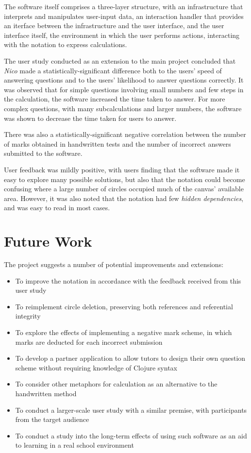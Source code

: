 \documentclass[12pt,twoside,notitlepage,xetex]{report}
\begin{document}
{The software itself comprises a three-layer structure, with an infrastructure that interprets and manipulates user-input data, an interaction handler that provides an iterface between the infrastructure and the user interface, and the user interface itself, the environment in which the user performs actions, interacting with the notation to express calculations.

The user study conducted as an extension to the main project concluded that \emph{Nico} made a statistically-significant difference both to the users' speed of answering questions and to the users' likelihood to answer questions correctly.  It was observed that for simple questions involving small numbers and few steps in the calculation, the software increased the time taken to answer.  For more complex questions, with many subcalculations and larger numbers, the software was shown to decrease the time taken for users to answer.

There was also a statistically-significant negative correlation between the number of marks obtained in handwritten tests and the number of incorrect answers submitted to the software.

User feedback was mildly positive, with users finding that the software made it easy to explore many possible solutions, but also that the notation could become confusing where a large number of circles occupied much of the canvas' available area.  However, it was also noted that the notation had few \emph{hidden dependencies}, and was easy to read in most cases.

\section{Future Work}

The project suggests a number of potential improvements and extensions:
\begin{itemize}
\item To improve the notation in accordance with the feedback received from this user study
\item To reimplement circle deletion, preserving both references and referential integrity
\item To explore the effects of implementing a negative mark scheme, in which marks are deducted for each incorrect submission
\item To develop a partner application to allow tutors to design their own question scheme without requiring knowledge of Clojure syntax
\item To consider other metaphors for calculation as an alternative to the handwritten method
\item To conduct a larger-scale user study with a similar premise, with participants from the target audience
\item To conduct a study into the long-term effects of using such software as an aid to learning in a real school environment
\end{itemize}

}
\end{document}
